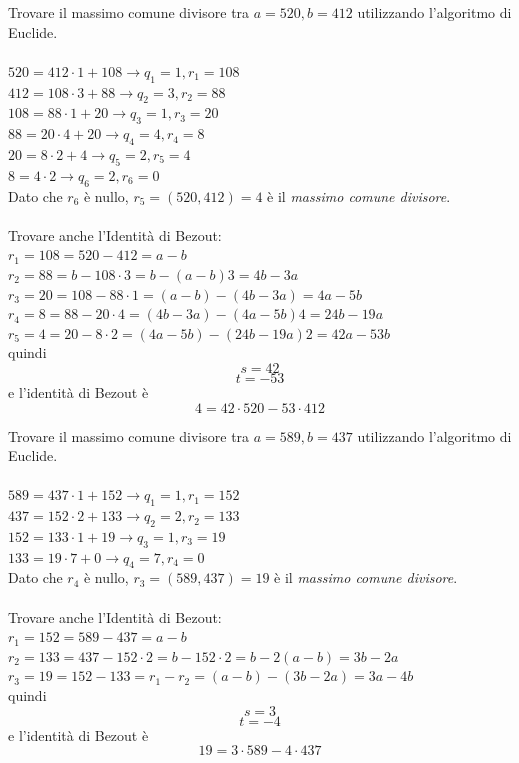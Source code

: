 \documentclass[a4paper,12pt, oneside]{book}
\begin{document}
	\begin{shaded}
		\begin{esempio}
			Trovare il massimo comune divisore tra $a=520, b=412$ utilizzando l'algoritmo di Euclide.\\\\
			$520 = 412 \cdot 1 + 108 \longrightarrow q_1=1, r_1 = 108$\\
			$412 = 108 \cdot 3 + 88 \longrightarrow q_2=3, r_2 = 88$\\
			$108 = 88 \cdot 1 + 20 \longrightarrow q_3=1, r_3 = 20$\\
			$88 = 20 \cdot 4 + 20 \longrightarrow q_4=4, r_4 = 8$\\
			$20 = 8 \cdot2 + 4 \longrightarrow q_5=2, r_5 = 4$\\
			$8 = 4 \cdot 2 \longrightarrow q_6=2, r_6 = 0$\\
			Dato che $r_6$ è nullo, $r_5 = (520,412) = 4$ è il \textit{massimo comune divisore}.\\\\
			Trovare anche l'Identità di Bezout:\\
			$r_1 = 108 =520 - 412 = a - b$\\
			$r_2 = 88 = b - 108 \cdot 3 = b-(a-b)3 = 4b-3a$\\
			$r_3 = 20 = 108 - 88 \cdot 1 = (a-b) - (4b-3a) = 4a-5b$\\
			$r_4 = 8 = 88-20 \cdot 4 = (4b-3a) - (4a-5b)4 = 24b-19a$\\
			$r_5 = 4 = 20 - 8 \cdot 2 = (4a-5b) - (24b-19a)2 = 42a-53b$\\
			quindi
			$$s = 42$$
			$$t = -53$$
			e l'identità di Bezout è
			$$4 = 42 \cdot 520 - 53 \cdot 412$$
		\end{esempio}
		\begin{esempio}
			Trovare il massimo comune divisore tra $a=589, b=437$ utilizzando l'algoritmo di Euclide.\\\\
			$589 = 437 \cdot 1 + 152 \longrightarrow q_1=1, r_1=152$\\
			$437 = 152 \cdot 2 + 133 \longrightarrow q_2=2, r_2=133$\\
			$152 = 133 \cdot 1 + 19 \longrightarrow q_3=1, r_3=19$\\
			$133 = 19 \cdot 7 + 0 \longrightarrow q_4 = 7, r_4 = 0$\\
			Dato che $r_4$ è nullo, $r_3 = (589,437) = 19$ è il \textit{massimo comune divisore}.\\\\
			Trovare anche l'Identità di Bezout:\\
			$r_1 = 152 = 589 - 437 = a-b$\\
			$r_2 = 133 = 437 - 152 \cdot 2 = b - 152 \cdot 2 = b-2(a-b) = 3b-2a$\\
			$r_3 = 19 = 152-133 = r_1-r_2 = (a-b)-(3b-2a) = 3a-4b$\\
			quindi
			$$s = 3$$ $$t=-4$$
			e l'identità di Bezout è
			$$19 = 3 \cdot 589 - 4 \cdot 437$$
		\end{esempio}
	\end{shaded}
\end{document}
